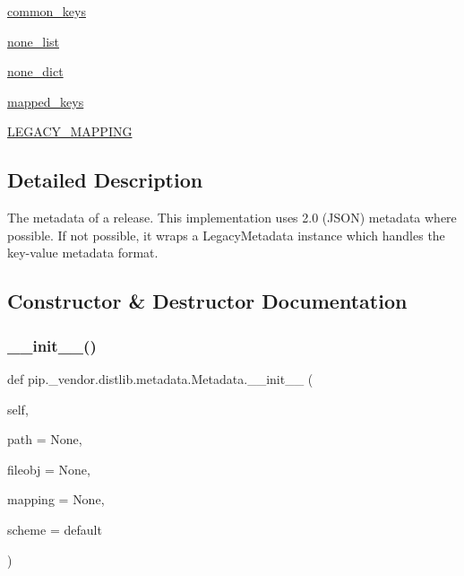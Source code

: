 \begin{DoxyCompactItemize}
\item 
\hyperlink{classpip_1_1__vendor_1_1distlib_1_1metadata_1_1Metadata_a53d86411c3e1982eda8fb61bf648f235}{common\+\_\+keys}
\item 
\hyperlink{classpip_1_1__vendor_1_1distlib_1_1metadata_1_1Metadata_ac0224e7e92db772527211464e569a269}{none\+\_\+list}
\item 
\hyperlink{classpip_1_1__vendor_1_1distlib_1_1metadata_1_1Metadata_a421863dad266e280c698b99df2380a3f}{none\+\_\+dict}
\item 
\hyperlink{classpip_1_1__vendor_1_1distlib_1_1metadata_1_1Metadata_a64a690dec4b75a28b3513bc83b7dec3e}{mapped\+\_\+keys}
\item 
\hyperlink{classpip_1_1__vendor_1_1distlib_1_1metadata_1_1Metadata_a64ba9fb6a5ebcbfc3b4f7786ebb0cec8}{L\+E\+G\+A\+C\+Y\+\_\+\+M\+A\+P\+P\+I\+NG}
\end{DoxyCompactItemize}


\subsection{Detailed Description}
\begin{DoxyVerb}The metadata of a release. This implementation uses 2.0 (JSON)
metadata where possible. If not possible, it wraps a LegacyMetadata
instance which handles the key-value metadata format.
\end{DoxyVerb}
 

\subsection{Constructor \& Destructor Documentation}
\mbox{\label{classpip_1_1__vendor_1_1distlib_1_1metadata_1_1Metadata_a100e20a955203ecb510ad8e7b59ba7df}} 
\subsubsection{\texorpdfstring{\+\_\+\+\_\+init\+\_\+\+\_\+()}{\_\_init\_\_()}}
{\footnotesize\ttfamily def pip.\+\_\+vendor.\+distlib.\+metadata.\+Metadata.\+\_\+\+\_\+init\+\_\+\+\_\+ (\begin{DoxyParamCaption}\item[{}]{self,  }\item[{}]{path = {\ttfamily None},  }\item[{}]{fileobj = {\ttfamily None},  }\item[{}]{mapping = {\ttfamily None},  }\item[{}]{scheme = {\ttfamily \textquotesingle{}default\textquotesingle{}} }\end{DoxyParamCaption})}



